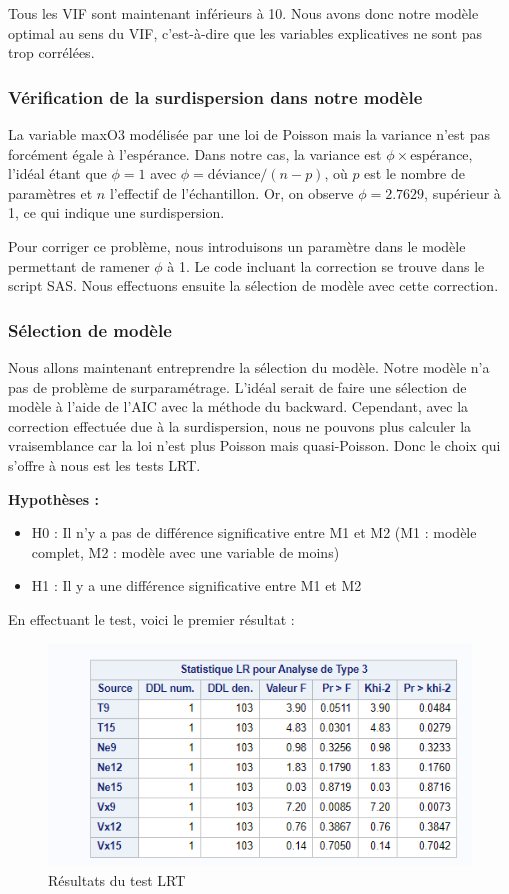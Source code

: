 \documentclass[12pt,a4paper]{article}
\begin{document}
Tous les VIF sont maintenant inférieurs à 10. Nous avons donc notre modèle optimal au sens du VIF, c'est-à-dire que les variables explicatives ne sont pas trop corrélées.

\subsubsection{Vérification de la surdispersion dans notre modèle}
La variable maxO3 modélisée par une loi de Poisson mais la variance n'est pas forcément égale à l'espérance. Dans notre cas, la variance est $\phi \times \text{espérance}$, l'idéal étant que $\phi = 1$ avec $\phi = \text{déviance}/(n - p)$, où $p$ est le nombre de paramètres et $n$ l'effectif de l'échantillon. Or, on observe $\phi = 2.7629$, supérieur à 1, ce qui indique une surdispersion.

Pour corriger ce problème, nous introduisons un paramètre dans le modèle permettant de ramener $\phi$ à 1. Le code incluant la correction se trouve dans le script SAS. Nous effectuons ensuite la sélection de modèle avec cette correction.

\subsubsection{Sélection de modèle}
Nous allons maintenant entreprendre la sélection du modèle. Notre modèle n'a pas de problème de surparamétrage. L'idéal serait de faire une sélection de modèle à l'aide de l'AIC avec la méthode du backward. Cependant, avec la correction effectuée due à la surdispersion, nous ne pouvons plus calculer la vraisemblance car la loi n'est plus Poisson mais quasi-Poisson. Donc le choix qui s'offre à nous est les tests LRT.

\textbf{Hypothèses :}
\begin{itemize}
	\item H0 : Il n'y a pas de différence significative entre M1 et M2 (M1 : modèle complet, M2 : modèle avec une variable de moins)
	\item H1 : Il y a une différence significative entre M1 et M2
\end{itemize}

En effectuant le test, voici le premier résultat :

\begin{figure}[H]
	\centering
	\includegraphics[width=\textwidth]{LRT_1.PNG}
	\caption{Résultats du test LRT}
	\label{fig:resultats_lrt1}
\end{figure}
\end{document}
